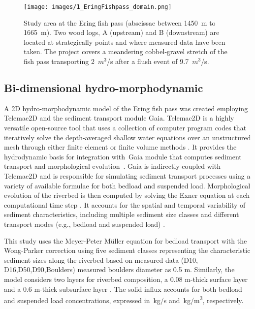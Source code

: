 \documentclass[draft,linenumbers,onecolumn]{agujournal2019} %
\begin{document}
\begin{figure}[htbp]
	\centering
	\texttt{[image: images/1\_EringFishpass\_domain.png]}
	\caption{Study area  at the Ering fish pass (abscissae between 1450~m to 1665~m). Two wood logs, A (upstream) and B (downstream) are located at strategically points and where measured data have been taken. The project covers a meandering cobbel-gravel stretch of the fish pass transporting 2~$m^3$/s after a flush event of 9.7~$m^3$/s.   
	}
	\label{fig:StudyArea}
\end{figure}


\subsection{Bi-dimensional hydro-morphodynamic}
\label{sec:Sec2.2}
A 2D hydro-morphodynamic model of the Ering fish pass was created employing Telemac2D and the sediment transport module Gaia. Telemac2D is a  highly versatile open-source tool that uses a collection of computer program codes that iteratively solve the depth-averaged shallow water equations \cite{saint-venant1871theorie} over an unstructured mesh through either finite element or finite volume methods \cite{galland1991telemac,hervouet2007hydrodynamics}. It provides the hydrodynamic basis for integration with Gaia module that computes sediment transport and morphological evolution \cite{tassi2023gaia}. Gaia is indirectly coupled with Telemac2D and is responsible for simulating sediment transport processes using a variety of available formulae for both bedload and suspended load. Morphological evolution of the riverbed is then computed by solving the Exner equation at each computational time step \cite{audouin2020introducing}. It accounts for the spatial and temporal variability of sediment characteristics, including multiple sediment size classes and different transport modes (e.g., bedload and suspended load) \cite{exner1925uber,tassi2023gaia}. 

This study uses the Meyer-Peter Müller equation for bedload transport with the Wong-Parker correction \cite{wong2006reanalysis} using five sediment classes representing the characteristic sediment sizes along the riverbed based on measured data (D10, D16,D50,D90,Boulders) measured boulders diameter as 0.5 m. Similarly, the model considers two layers for riverbed composition, a 0.08 m-thick surface layer and a 0.6 m-thick subsurface layer \cite{scolari2025hydromorphodynamic}. The solid influx accounts for both bedload and suspended load concentrations, expressed in~kg/s and~kg/m\textsuperscript{3}, respectively.
\end{document}
